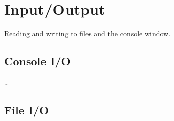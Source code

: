 \chapter{Input/Output}
\label{chap:IO}

Reading and writing to files and the console window.
\section{Console I/O}
\dots
\section{File I/O}

